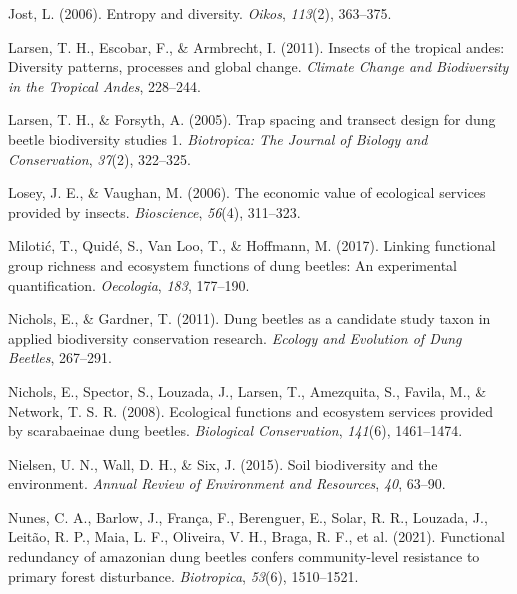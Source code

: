 \documentclass[
  11pt,
  a4paper]{book}
\newlength{\cslhangindent}
\newlength{\cslentryspacingunit} %
\newenvironment{CSLReferences}[2] %
 {%
  \setlength{\parindent}{0pt}
  \ifodd #1
  \let\oldpar\par
  \def\par{\hangindent=\cslhangindent\oldpar}
  \fi
  \setlength{\parskip}{#2\cslentryspacingunit}
 }%
 {}
\begin{document}
\begin{CSLReferences}{1}{0}
\leavevmode{}%
Jost, L. (2006). Entropy and diversity. \emph{Oikos}, \emph{113}(2), 363--375.

\leavevmode{}%
Larsen, T. H., Escobar, F., \& Armbrecht, I. (2011). Insects of the tropical andes: Diversity patterns, processes and global change. \emph{Climate Change and Biodiversity in the Tropical Andes}, 228--244.

\leavevmode{}%
Larsen, T. H., \& Forsyth, A. (2005). Trap spacing and transect design for dung beetle biodiversity studies 1. \emph{Biotropica: The Journal of Biology and Conservation}, \emph{37}(2), 322--325.

\leavevmode{}%
Losey, J. E., \& Vaughan, M. (2006). The economic value of ecological services provided by insects. \emph{Bioscience}, \emph{56}(4), 311--323.

\leavevmode{}%
Milotić, T., Quidé, S., Van Loo, T., \& Hoffmann, M. (2017). Linking functional group richness and ecosystem functions of dung beetles: An experimental quantification. \emph{Oecologia}, \emph{183}, 177--190.

\leavevmode{}%
Nichols, E., \& Gardner, T. (2011). Dung beetles as a candidate study taxon in applied biodiversity conservation research. \emph{Ecology and Evolution of Dung Beetles}, 267--291.

\leavevmode{}%
Nichols, E., Spector, S., Louzada, J., Larsen, T., Amezquita, S., Favila, M., \& Network, T. S. R. (2008). Ecological functions and ecosystem services provided by scarabaeinae dung beetles. \emph{Biological Conservation}, \emph{141}(6), 1461--1474.

\leavevmode{}%
Nielsen, U. N., Wall, D. H., \& Six, J. (2015). Soil biodiversity and the environment. \emph{Annual Review of Environment and Resources}, \emph{40}, 63--90.

\leavevmode{}%
Nunes, C. A., Barlow, J., França, F., Berenguer, E., Solar, R. R., Louzada, J., Leitão, R. P., Maia, L. F., Oliveira, V. H., Braga, R. F., et al. (2021). Functional redundancy of amazonian dung beetles confers community-level resistance to primary forest disturbance. \emph{Biotropica}, \emph{53}(6), 1510--1521.


\end{CSLReferences}
\end{document}
